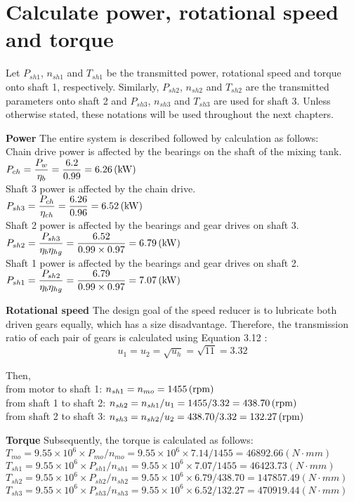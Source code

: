 \section{Calculate power, rotational speed and torque}
Let $ P_{sh1} $, $ n_{sh1} $ and $ T_{sh1} $ be the transmitted power, rotational speed and torque onto shaft 1, respectively. Similarly, $ P_{sh2} $, $ n_{sh2} $ and $ T_{sh2} $ are the transmitted parameters onto shaft 2 and $ P_{sh3} $, $ n_{sh3} $ and $ T_{sh3} $ are used for shaft 3. Unless otherwise stated, these notations will be used throughout the next chapters.

\textbf{Power} The entire system is described followed by calculation as follows:\\
Chain drive power is affected by the bearings on the shaft of the mixing tank.\\
$ P_{ch} = \dfrac{P_w}{\eta_b} = \dfrac{6.2}{0.99} = 6.26 \, (\mathrm{kW})$\\
Shaft 3 power is affected by the chain drive.\\
$ P_{sh3} = \dfrac{P_{ch}}{\eta_{ch}} = \dfrac{6.26}{0.96} = 6.52 \, (\mathrm{kW})$\\
Shaft 2 power is affected by the bearings and gear drives on shaft 3.\\
$ P_{sh2} = \dfrac{P_{sh3}}{\eta_b\eta_{hg}} = \dfrac{6.52}{0.99 \times 0.97} = 6.79 \, (\mathrm{kW})$\\
Shaft 1 power is affected by the bearings and gear drives on shaft 2.\\
$ P_{sh1} = \dfrac{P_{sh2}}{\eta_b\eta_{hg}} = \dfrac{6.79}{0.99 \times 0.97} = 7.07 \, (\mathrm{kW})$

\textbf{Rotational speed} The design goal of the speed reducer is to lubricate both driven gears equally, which has a size disadvantage. Therefore, the transmission ratio of each pair of gears is calculated using Equation 3.12 \cite{tk1}:
\[u_1=u_2=\sqrt{u_h}=\sqrt{11}=3.32\]

Then,\\
from motor to shaft 1: $ n_{sh1} = n_{mo} = 1455 \, (\mathrm{rpm})$ \\
from shaft 1 to shaft 2: $ n_{sh2} = {n_{sh1}}/{u_{1}} = 1455/3.32 = 438.70 \, (\mathrm{rpm})$\\
from shaft 2 to shaft 3: $ n_{sh3} = {n_{sh2}}/{u_{2}} = 438.70/3.32 = 132.27 \, (\mathrm{rpm})$

\textbf{Torque} Subsequently, the torque is calculated as follows:\\
$ T_{mo}  = 9.55\times10^6 \times P_{mo}/n_{mo} = 9.55\times10^6 \times 7.14/1455 = 46892.66 \unit{(N\cdot mm)}$\\
$ T_{sh1} = 9.55\times10^6 \times {P_{sh1}}/{n_{sh1}} = 9.55\times10^6 \times 7.07/1455 = 46423.73 \unit{(N\cdot mm)}$\\
$ T_{sh2} = 9.55\times10^6 \times {P_{sh2}}/{n_{sh2}} = 9.55\times10^6 \times 6.79/438.70 = 147857.49 \unit{(N\cdot mm)}$\\
$ T_{sh3} = 9.55\times10^6 \times {P_{sh3}}/{n_{sh3}} = 9.55\times10^6 \times 6.52/132.27 = 470919.44 \unit{(N\cdot mm)}$

